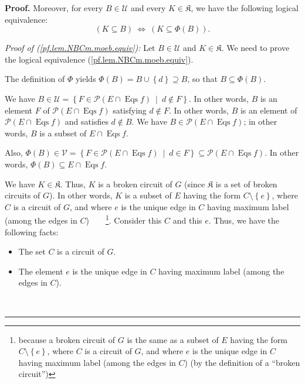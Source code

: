 \documentclass[numbers=enddot,12pt,final,onecolumn,notitlepage]{scrartcl}%
\theoremstyle{definition}
\newenvironment{proof}[1][Proof]{\noindent\textbf{#1.} }{\ \rule{0.5em}{0.5em}}
\newenvironment{verlong}{}{}
\begin{document}
\begin{verlong}
\begin{proof}
Moreover, for every $B\in\mathcal{U}$ and every $K\in\mathfrak{K}$, we have
the following logical equivalence:%
\begin{equation}
\left(  K\subseteq B\right)  \ \Longleftrightarrow\ \left(  K\subseteq
\Phi\left(  B\right)  \right)  . \label{pf.lem.NBCm.moeb.equiv}%
\end{equation}


\textit{Proof of (\ref{pf.lem.NBCm.moeb.equiv}):} Let $B\in\mathcal{U}$ and
$K\in\mathfrak{K}$. We need to prove the logical equivalence
(\ref{pf.lem.NBCm.moeb.equiv}).

The definition of $\Phi$ yields $\Phi\left(  B\right)  =B\cup\left\{
d\right\}  \supseteq B$, so that $B\subseteq\Phi\left(  B\right)  $.

We have $B\in\mathcal{U}=\left\{  F\in\mathcal{P}\left(  E\cap
\operatorname*{Eqs}f\right)  \ \mid\ d\notin F\right\}  $. In other words, $B$
is an element $F$ of $\mathcal{P}\left(  E\cap\operatorname*{Eqs}f\right)  $
satisfying $d\notin F$. In other words, $B$ is an element of $\mathcal{P}%
\left(  E\cap\operatorname*{Eqs}f\right)  $ and satisfies $d\notin B$. We have
$B\in\mathcal{P}\left(  E\cap\operatorname*{Eqs}f\right)  $; in other words,
$B$ is a subset of $E\cap\operatorname*{Eqs}f$.

Also, $\Phi\left(  B\right)  \in\mathcal{V}=\left\{  F\in\mathcal{P}\left(
E\cap\operatorname*{Eqs}f\right)  \ \mid\ d\in F\right\}  \subseteq
\mathcal{P}\left(  E\cap\operatorname*{Eqs}f\right)  $. In other words,
$\Phi\left(  B\right)  \subseteq E\cap\operatorname*{Eqs}f$.

We have $K\in\mathfrak{K}$. Thus, $K$ is a broken circuit of $G$ (since
$\mathfrak{K}$ is a set of broken circuits of $G$). In other words, $K$ is a
subset of $E$ having the form $C\setminus\left\{  e\right\}  $, where $C$ is a
circuit of $G$, and where $e$ is the unique edge in $C$ having maximum label
(among the edges in $C$)\ \ \ \ \footnote{because a broken circuit of $G$ is
the same as a subset of $E$ having the form $C\setminus\left\{  e\right\}  $,
where $C$ is a circuit of $G$, and where $e$ is the unique edge in $C$ having
maximum label (among the edges in $C$) (by the definition of a
\textquotedblleft broken circuit\textquotedblright)}. Consider this $C$ and
this $e$. Thus, we have the following facts:

\begin{itemize}
\item The set $C$ is a circuit of $G$.

\item The element $e$ is the unique edge in $C$ having maximum label (among
the edges in $C$).


\end{itemize}
\end{proof}
\end{verlong}
\end{document}
